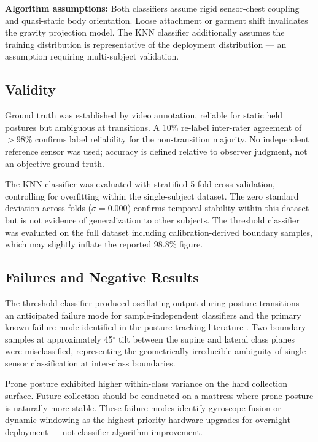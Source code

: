 \documentclass[conference]{IEEEtran}
\begin{document}
\textbf{Algorithm assumptions:}
Both classifiers assume rigid sensor-chest coupling and quasi-static body orientation.
Loose attachment or garment shift invalidates the gravity projection model.
The KNN classifier additionally assumes the training distribution is representative
of the deployment distribution --- an assumption requiring multi-subject validation.

\subsection{Validity}

Ground truth was established by video annotation, reliable for static held postures
but ambiguous at transitions.
A 10\% re-label inter-rater agreement of $>$98\% confirms label reliability for the
non-transition majority.
No independent reference sensor was used; accuracy is defined relative to observer
judgment, not an objective ground truth.

The KNN classifier was evaluated with stratified 5-fold cross-validation, controlling
for overfitting within the single-subject dataset.
The zero standard deviation across folds ($\sigma=0.000$) confirms temporal stability
within this dataset but is not evidence of generalization to other subjects.
The threshold classifier was evaluated on the full dataset including calibration-derived
boundary samples, which may slightly inflate the reported 98.8\% figure.

\subsection{Failures and Negative Results}

The threshold classifier produced oscillating output during posture transitions ---
an anticipated failure mode for sample-independent classifiers and the primary known
failure mode identified in the posture tracking literature \cite{alinia2020}.
Two boundary samples at approximately 45$^\circ$ tilt between the supine and lateral
class planes were misclassified, representing the geometrically irreducible ambiguity
of single-sensor classification at inter-class boundaries.

Prone posture exhibited higher within-class variance on the hard collection surface.
Future collection should be conducted on a mattress where prone posture is naturally
more stable.
These failure modes identify gyroscope fusion or dynamic windowing as the
highest-priority hardware upgrades for overnight deployment --- not classifier
algorithm improvement.
\end{document}
